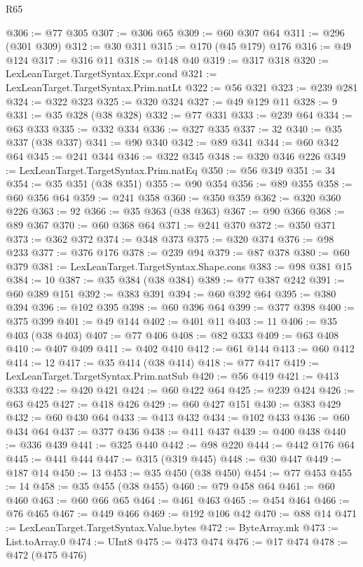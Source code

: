 \begin{lexlean}{R65}
\begin{coremodule}
@306 := @77 @305
@307 := @306 @65
@309 := @60 @307 @64
@311 := @296 (@301 @309)
@312 := @30 @311
@315 := @170 (@45 @179) @176
@316 := @49 @124
@317 := @316 @11
@318 := @148 @40
@319 := @317 @318
@320 := LexLeanTarget.TargetSyntax.Expr.cond
@321 := LexLeanTarget.TargetSyntax.Prim.natLt
@322 := @56 @321
@323 := @239 @281
@324 := @322 @323
@325 := @320 @324
@327 := @49 @129 @11
@328 := 9
@331 := @35 @328 (@38 @328)
@332 := @77 @331
@333 := @239 @64
@334 := @63 @333
@335 := @332 @334
@336 := @327 @335
@337 := 32
@340 := @35 @337 (@38 @337)
@341 := @90 @340
@342 := @89 @341
@344 := @60 @342 @64
@345 := @241 @344
@346 := @322 @345
@348 := @320 @346 @226
@349 := LexLeanTarget.TargetSyntax.Prim.natEq
@350 := @56 @349
@351 := 34
@354 := @35 @351 (@38 @351)
@355 := @90 @354
@356 := @89 @355
@358 := @60 @356 @64
@359 := @241 @358
@360 := @350 @359
@362 := @320 @360 @226
@363 := 92
@366 := @35 @363 (@38 @363)
@367 := @90 @366
@368 := @89 @367
@370 := @60 @368 @64
@371 := @241 @370
@372 := @350 @371
@373 := @362 @372
@374 := @348 @373
@375 := @320 @374
@376 := @98 @233
@377 := @376 @176
@378 := @239 @94
@379 := @87 @378
@380 := @60 @379
@381 := LexLeanTarget.TargetSyntax.Shape.cons
@383 := @98 @381 @15
@384 := 10
@387 := @35 @384 (@38 @384)
@389 := @77 @387 @242
@391 := @60 @389 @151
@392 := @383 @391
@394 := @60 @392 @64
@395 := @380 @394
@396 := @102 @395
@398 := @60 @396 @64
@399 := @377 @398
@400 := @375 @399
@401 := @49 @144
@402 := @401 @11
@403 := 11
@406 := @35 @403 (@38 @403)
@407 := @77 @406
@408 := @82 @333
@409 := @63 @408
@410 := @407 @409
@411 := @402 @410
@412 := @61 @144
@413 := @60 @412
@414 := 12
@417 := @35 @414 (@38 @414)
@418 := @77 @417
@419 := LexLeanTarget.TargetSyntax.Prim.natSub
@420 := @56 @419
@421 := @413 @333
@422 := @420 @421
@424 := @60 @422 @64
@425 := @239 @424
@426 := @63 @425
@427 := @418 @426
@429 := @60 @427 @151
@430 := @383 @429
@432 := @60 @430 @64
@433 := @413 @432
@434 := @102 @433
@436 := @60 @434 @64
@437 := @377 @436
@438 := @411 @437
@439 := @400 @438
@440 := @336 @439
@441 := @325 @440
@442 := @98 @220
@444 := @442 @176 @64
@445 := @441 @444
@447 := @315 (@319 @445)
@448 := @30 @447
@449 := @187 @14
@450 := 13
@453 := @35 @450 (@38 @450)
@454 := @77 @453
@455 := 14
@458 := @35 @455 (@38 @455)
@460 := @79 @458 @64
@461 := @60 @460
@463 := @60 @66 @65
@464 := @461 @463
@465 := @454 @464
@466 := @76 @465
@467 := @449 @466
@469 := @192 @106 @42
@470 := @88 @14
@471 := LexLeanTarget.TargetSyntax.Value.bytes
@472 := ByteArray.mk
@473 := List.toArray.{0}
@474 := UInt8
@475 := @473 @474
@476 := @17 @474
@478 := @472 (@475 @476)

\end{coremodule}
\end{lexlean}
